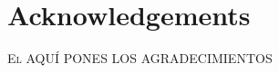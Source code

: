 \chapter*{Acknowledgements}
\pagestyle{empty}

\lettrine[lraise=-0.1, lines=2, loversize=0.25]{E}{l} AQUÍ PONES LOS AGRADECIMIENTOS


{}%
\vspace{-.3cm}

{}%